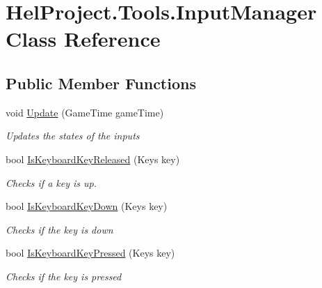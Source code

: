 \hypertarget{class_hel_project_1_1_tools_1_1_input_manager}{}\section{Hel\+Project.\+Tools.\+Input\+Manager Class Reference}
\label{class_hel_project_1_1_tools_1_1_input_manager}
\subsection*{Public Member Functions}
\begin{DoxyCompactItemize}
\item 
void \hyperlink{class_hel_project_1_1_tools_1_1_input_manager_a1b2309a8588cc0ca3281dde3441a7f62}{Update} (Game\+Time game\+Time)
\begin{DoxyCompactList}\small\item\em Updates the states of the inputs \end{DoxyCompactList}\item 
bool \hyperlink{class_hel_project_1_1_tools_1_1_input_manager_ac3fcf13172129089d4ff1c9649b7fdf9}{Is\+Keyboard\+Key\+Released} (Keys key)
\begin{DoxyCompactList}\small\item\em Checks if a key is up. \end{DoxyCompactList}\item 
bool \hyperlink{class_hel_project_1_1_tools_1_1_input_manager_a79d8a0ffbcfe8c06a68e6bf00ab6370f}{Is\+Keyboard\+Key\+Down} (Keys key)
\begin{DoxyCompactList}\small\item\em Checks if the key is down \end{DoxyCompactList}\item 
bool \hyperlink{class_hel_project_1_1_tools_1_1_input_manager_a0313c513ccbc655ea8f0de8c1d6675af}{Is\+Keyboard\+Key\+Pressed} (Keys key)
\begin{DoxyCompactList}\small\item\em Checks if the key is pressed \end{DoxyCompactList}\end{DoxyCompactItemize}
